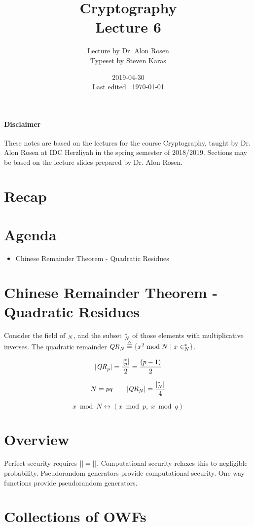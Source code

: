 \documentclass{idc_msc}
\title{Cryptography \\\large Lecture 6}
\date{2019-04-30 \\ Last edited \currenttime\ \today}
\author{Lecture by Dr. Alon Rosen\\Typeset by Steven Karas}
\let\Cipherspace\relax
\newcommand{\Cipherspace}{\texorpdfstring{\ensuremath{\mathcal{C}}}{C}}
\let\Keyspace\relax
\newcommand{\Keyspace}{\texorpdfstring{\ensuremath{\mathcal{K}}}{K}}
\let\ints\relax
\newcommand{\ints}{\ensuremath{\mathbb{Z}}}
\begin{document}
\paragraph{Disclaimer}

These notes are based on the lectures for the course Cryptography, taught by Dr. Alon Rosen at IDC Herzliyah in the spring semester of 2018/2019.
Sections may be based on the lecture slides prepared by Dr. Alon Rosen.

\nocite{Katz:2014:IMC:2700550}

\section{Recap}

\section{Agenda}

\begin{itemize}
  \item Chinese Remainder Theorem - Quadratic Residues
\end{itemize}

\section{Chinese Remainder Theorem - Quadratic Residues}

Consider the field of \(\ints_N\), and the subset \(\ints_N^*\) of those elements with multiplicative inverses.
The quadratic remainder \(\mathit{QR}_N \overset{\triangle}{=} \{x^2 \bmod N \mid x \in \ints_N^*\}\).

\[
  |\mathit{QR}_p| = \frac{|\ints_p^*|}{2} = \frac{(p-1)}{2}
\]

\[
  N = pq \qquad |\mathit{QR}_N| = \frac{|\ints_N^*|}{4}
\]

\[
  x \bmod N \longleftrightarrow (x \bmod p,\; x \bmod q)
\]

\section{Overview}

Perfect security requires \( |\Keyspace| = |\Cipherspace| \).
Computational security relaxes this to negligible probability.
Pseudorandom generators provide computational security.
One way functions provide pseudorandom generators.

\section{Collections of OWFs}
\end{document}
